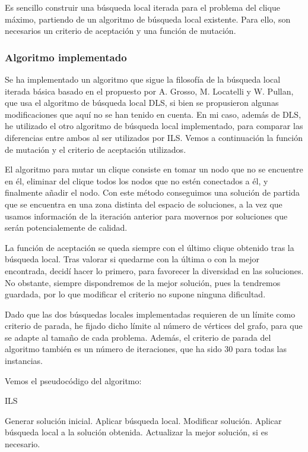 Es sencillo construir una búsqueda local iterada para el problema del clique máximo, partiendo de un
algoritmo de búsqueda local existente. Para ello, son necesarios un criterio de aceptación y una
función de mutación.

\subsubsection{Algoritmo implementado}

Se ha implementado un algoritmo que sigue la filosofía de la búsqueda local iterada básica basado en
el propuesto por A. Grosso, M. Locatelli y W. Pullan, que usa el algoritmo de búsqueda local
DLS, si bien se propusieron algunas modificaciones que aquí no se han tenido en cuenta.
En mi caso, además de DLS, he utilizado el otro algoritmo de búsqueda local implementado,
para comparar las diferencias entre ambos al ser utilizados por ILS.
Vemos a continuación la función de mutación y el criterio de aceptación utilizados.

El algoritmo para mutar un clique consiste en tomar un nodo que no se encuentre en él, eliminar del clique
todos los nodos que no estén conectados a él, y finalmente añadir el nodo. Con este método conseguimos
una solución de partida que se encuentra en una zona distinta del espacio de soluciones, a la vez que
usamos información de la iteración anterior para movernos por soluciones que serán potencialemente de calidad.

La función de aceptación se queda siempre con el último clique obtenido tras la búsqueda local. Tras valorar
si quedarme con la última o con la mejor encontrada, decidí hacer lo primero, para favorecer la diversidad en
las soluciones. No obstante, siempre dispondremos de la mejor solución, pues la tendremos guardada, por lo
que modificar el criterio no supone ninguna dificultad.

Dado que las dos búsquedas locales implementadas requieren de un límite como criterio de parada, he fijado dicho
límite al número de vértices del grafo, para que se adapte al tamaño de cada problema. Además, el criterio de
parada del algoritmo también es un número de iteraciones, que ha sido $30$ para todas las instancias.

Vemos el pseudocódigo del algoritmo:

\begin{algorithm}[H]
\caption{ILS}
  \begin{algorithmic}
    \State Generar solución inicial.
    \State Aplicar búsqueda local.
    \Repeat
      \State Modificar solución.
      \State Aplicar búsqueda local a la solución obtenida.
      \State Actualizar la mejor solución, si es necesario.
  \end{algorithmic}
\end{algorithm}

